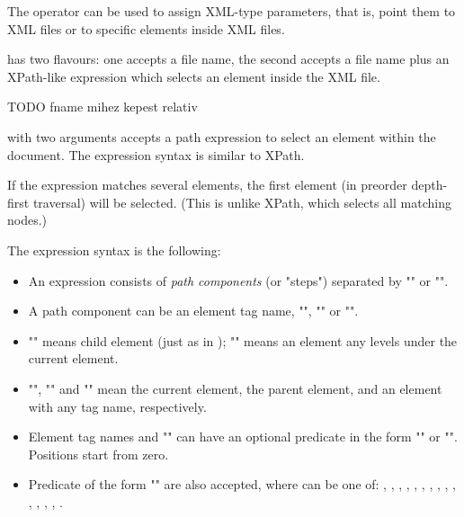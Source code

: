 The  operator can be used to assign XML-type parameters,
that is, point them to XML files or to specific elements inside XML files.

 has two flavours: one accepts a file name, the second accepts
a file name plus an XPath-like expression which selects an element
inside the XML file.

TODO fname mihez kepest relativ

 with two arguments accepts a path expression
to select an element within the document. The expression syntax is
similar to XPath.

If the expression matches several elements, the first element
(in preorder depth-first traversal) will be selected. (This is
unlike XPath, which selects all matching nodes.)

The expression syntax is the following:
\begin{itemize}
  \item An expression consists of \textit{path components} (or "steps")
        separated by "\ttt{/}" or "\ttt{//}".
  \item A path component can be an element tag name, "\ttt{*}", ""
        or "".
  \item "\ttt{/}" means child element (just as in );
        "\ttt{//}" means an element any levels under the current element.
  \item "", "" and "\ttt{*}" mean the current element,
        the parent element, and an element with any tag name, respectively.
  \item Element tag names and "\ttt{*}" can have an optional predicate
        in the form "\ttt{[position]}" or "\ttt{[@attribute='value']}".
        Positions start from zero.
  \item Predicate of the form "\ttt{[@attribute=\textit{\$param}]}" are also
        accepted, where  can be one of:
        ,
        ,
        ,
        ,
        ,
        ,
        ,
        ,
        ,
        ,
        ,
        ,
        ,
        ,
        .
\end{itemize}

